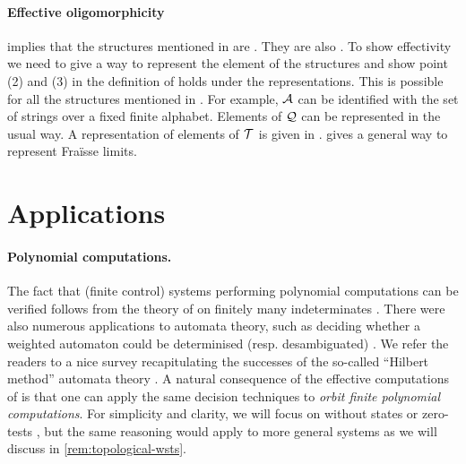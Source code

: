 \paragraph{Effective oligomorphicity}
%
\cite[Theorem 7.6]{BOJAN16inf} implies that the structures mentioned in   are .
They are also .
To show effectivity we need to give a way to represent the element of the structures and show point (2) and (3) in the definition of  holds under the representations.
This is possible for all the structures mentioned in .
For example, $\mathcal{A}$ can be identified with the set of strings over a fixed finite alphabet.
Elements of $\mathcal{Q}$ can be represented in the usual way.
A representation of elements of $\mathcal{T}$ is given in \cite[Page 244-245]{BOJAN16inf}.
\cite{CompFraisse} gives a general way to represent Fra\"{i}sse limits.
%
\section{Applications}

\paragraph{Polynomial computations.} \AP The fact that (finite control) systems
performing polynomial computations can be verified follows from the theory of
 on finitely many indeterminates \cite{MULSEI02,BEDUSHWO17}.
There were also numerous applications to automata theory, such as deciding
whether a weighted automaton could be determinised (resp. desambiguated)
\cite{BESM23,PUSM24}. We refer the readers to a nice survey recapitulating the
successes of the so-called ``Hilbert method'' automata theory \cite{BOJAN19}. A
natural consequence of the effective computations of  is that one can apply the same decision techniques to \emph{orbit finite
polynomial computations}. For simplicity and clarity, we will focus on
 without states or zero-tests \cite{BEDUSHWO17}, but
the same reasoning would apply to more general systems as we will discuss in
\cref{rem:topological-wsts}.


